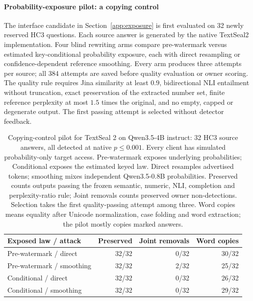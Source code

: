 \paragraph{Probability-exposure pilot: a copying control}
\label{sec:exposure_control}
The interface candidate in Section~\ref{app:exposure} is first evaluated on 32 newly reserved HC3 questions. Each source answer is generated by the native TextSeal2 implementation. Four blind rewriting arms compare pre-watermark versus estimated key-conditional probability exposure, each with direct resampling or confidence-dependent reference smoothing. Every arm produces three attempts per source; all 384 attempts are saved before quality evaluation or owner scoring. The quality rule requires Jina similarity at least $0.9$, bidirectional NLI entailment without truncation, exact preservation of the extracted number set, finite reference perplexity at most $1.5$ times the original, and no empty, capped or degenerate output. The first passing attempt is selected without detector feedback.

\begin{table}[ht]\centering\small
\begin{tabular}{lrrr}\toprule
Exposed law / attack & Preserved & Joint removals & Word copies\\\midrule
Pre-watermark / direct & 32/32 & 0/32 & 30/32\\
Pre-watermark / smoothing & 32/32 & 2/32 & 25/32\\
Conditional / direct & 32/32 & 0/32 & 26/32\\
Conditional / smoothing & 32/32 & 0/32 & 29/32\\\bottomrule
\end{tabular}
\caption{Copying-control pilot for TextSeal 2 on Qwen3.5-4B instruct: 32 HC3 source answers, all detected at native $p\leq0.001$. Every client has simulated probability-only target access. Pre-watermark exposes underlying probabilities; Conditional exposes the estimated keyed law. Direct resamples advertised tokens; smoothing mixes independent Qwen3.5-0.8B probabilities. Preserved counts outputs passing the frozen semantic, numeric, NLI, completion and perplexity-ratio rule; Joint removals counts preserved owner non-detections. Selection takes the first quality-passing attempt among three. Word copies means equality after Unicode normalization, case folding and word extraction; the pilot mostly copies marked answers.}
\end{table}

